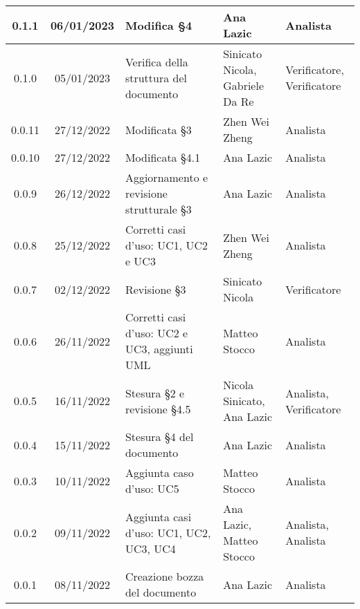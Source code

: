 \begin{center}
\begin{tabularx}{\textwidth}{| c | c | X | X | X |}
	0.1.1 & 06/01/2023 & Modifica §4 & Ana Lazic & Analista \\
	\hline
	0.1.0 & 05/01/2023 & Verifica della struttura del documento & Sinicato Nicola, Gabriele Da Re & Verificatore, Verificatore\\
	\hline
	0.0.11 & 27/12/2022 & Modificata §3 & Zhen Wei Zheng & Analista\\
    	\hline
	0.0.10 & 27/12/2022 & Modificata §4.1 & Ana Lazic & Analista\\
   	\hline
	0.0.9 & 26/12/2022 & Aggiornamento e revisione strutturale §3 & Ana Lazic & Analista\\
	\hline
	0.0.8 & 25/12/2022 & Corretti casi d'uso: UC1, UC2 e UC3 & Zhen Wei Zheng & Analista\\
	\hline
	0.0.7 & 02/12/2022 & Revisione §3 & Sinicato Nicola & Verificatore\\
	\hline
	0.0.6 & 26/11/2022 & Corretti casi d'uso: UC2 e UC3, aggiunti UML & Matteo Stocco & Analista\\
	\hline
	0.0.5 & 16/11/2022	 & Stesura §2 e revisione §4.5 & Nicola Sinicato, Ana Lazic & Analista, Verificatore\\
	\hline
	0.0.4 & 15/11/2022	 & Stesura §4 del documento & Ana Lazic & Analista\\
	\hline
	0.0.3 & 10/11/2022 & Aggiunta caso d’uso: UC5 & Matteo Stocco & Analista\\
	\hline
	0.0.2 & 09/11/2022	 & Aggiunta casi d’uso: UC1, UC2, UC3, UC4 & Ana Lazic, Matteo Stocco & Analista, Analista\\
	\hline
	0.0.1 & 08/11/2022 & Creazione bozza del documento & Ana Lazic & Analista\\
	\hline
\end{tabularx}		
\end{center}
